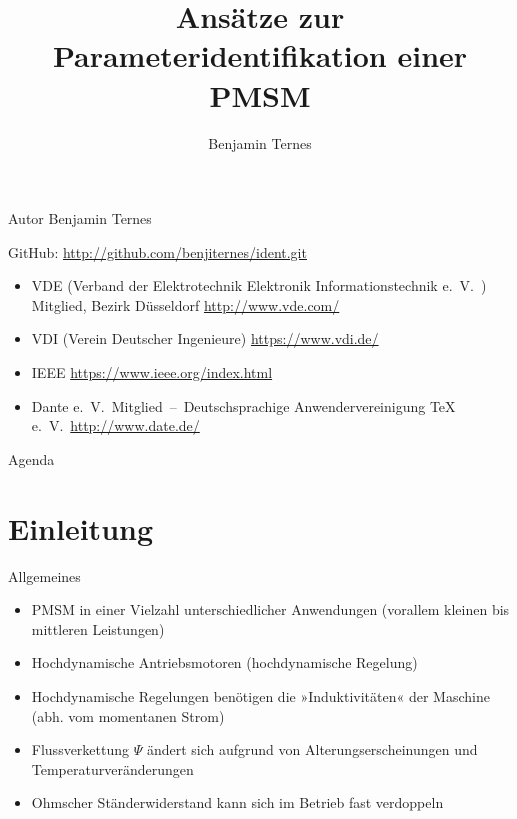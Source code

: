 \documentclass{beamer}
\title[Parameteridentifikation]{Ansätze zur Parameteridentifikation einer PMSM}
\author[Benjamin Ternes]%
{%
Benjamin Ternes
}
\institute{%
Hochschule Bochum\\
Fachbereich Elektrotechnik und Informatik}
\begin{document}
\begin{frame}[plain]
	\titlepage
\end{frame}

\begin{frame}[plain]{Autor}
Benjamin Ternes

GitHub: \url{http://github.com/benjiternes/ident.git}
\begin{itemize}
	\item VDE (Verband der Elektrotechnik Elektronik Informationstechnik e.\ V.\ ) Mitglied, Bezirk Düsseldorf	\url{http://www.vde.com/}
	\item VDI (Verein Deutscher Ingenieure) \url{https://www.vdi.de/}
	\item IEEE \url{https://www.ieee.org/index.html}
	\item Dante e.\ V.\ Mitglied~--~Deutschsprachige Anwendervereinigung TeX e.\ V.\ \url{http://www.date.de/}
\end{itemize}

\end{frame}

\begin{frame}[plain]{Agenda}
	\tableofcontents
\end{frame}

\section{Einleitung}
\begin{frame}{Allgemeines}
\begin{itemize}
\item PMSM in einer Vielzahl unterschiedlicher Anwendungen (vorallem kleinen bis mittleren Leistungen)
\item Hochdynamische Antriebsmotoren (hochdynamische Regelung)
\item Hochdynamische Regelungen benötigen die »Induktivitäten« der Maschine (abh. vom momentanen Strom)
\item Flussverkettung $\Psi$ ändert sich aufgrund von Alterungserscheinungen und Temperaturveränderungen
\item Ohmscher Ständerwiderstand kann sich im Betrieb fast verdoppeln
\end{itemize}
\end{frame}
\end{document}
